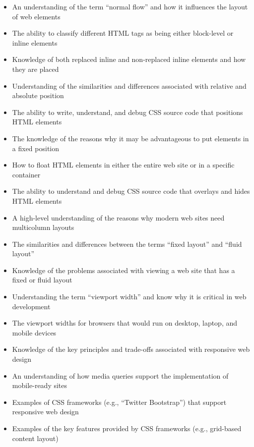 \documentclass[11pt]{article}
\begin{document}
\begin{itemize}

  \itemsep 0in

  \item An understanding of the term ``normal flow'' and how it influences the
    layout of web elements

  \item The ability to classify different HTML tags as being either block-level
    or inline elements

  \item Knowledge of both replaced inline and non-replaced inline elements and
    how they are placed

  \item Understanding of the similarities and differences associated with
    relative and absolute position

  \item The ability to write, understand, and debug CSS source code that
    positions HTML elements

  \item The knowledge of the reasons why it may be advantageous to put elements
    in a fixed position

  \item How to float HTML elements in either the entire web site or in a
    specific container

  \item The ability to understand and debug CSS source code that overlays and
    hides HTML elements

  \item A high-level understanding of the reasons why modern web sites need
    multicolumn layouts

  \item The similarities and differences between the terms ``fixed layout'' and
    ``fluid layout''

  \item Knowledge of the problems associated with viewing a web site that has a
    fixed or fluid layout

  \item Understanding the term ``viewport width'' and know why it is critical in
    web development

  \item The viewport widths for browsers that would run on desktop, laptop, and
    mobile devices

  \item Knowledge of the key principles and trade-offs associated with
    responsive web design

  \item An understanding of how media queries support the implementation of
    mobile-ready sites

  \item Examples of CSS frameworks (e.g., ``Twitter Bootstrap'') that support
    responsive web design

  \item Examples of the key features provided by CSS frameworks (e.g.,
    grid-based content layout)

\end{itemize}
\end{document}
